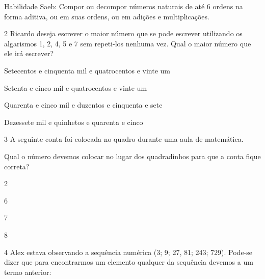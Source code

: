 {{Habilidade Saeb: Compor ou decompor números naturais de até 6 ordens na
forma aditiva, ou em suas ordens, ou em adições e multiplicações.}

\num{2} Ricardo deseja escrever o maior número que se pode escrever
utilizando os algarismos 1, 2, 4, 5 e 7 sem repeti-los nenhuma vez. Qual
o maior número que ele irá escrever?

\begin{escolha}
\item
  Setecentos e cinquenta mil e quatrocentos e vinte um
\item
  Setenta e cinco mil e quatrocentos e vinte um
\item
  Quarenta e cinco mil e duzentos e cinquenta e sete
\item
  Dezessete mil e quinhetos e quarenta e cinco
\end{escolha}


\num{3} A seguinte conta foi colocada no quadro durante uma aula de
matemática.


Qual o número devemos colocar no lugar dos quadradinhos para que a conta
fique correta?

\begin{escolha}
\item
  2
\item
  6
\item
  7
\item
  8
\end{escolha}


\num{4} Alex estava observando a sequência numérica (3; 9; 27, 81; 243;
729). Pode-se dizer que para encontrarmos um elemento qualquer da
sequência devemos a um termo anterior:

}
